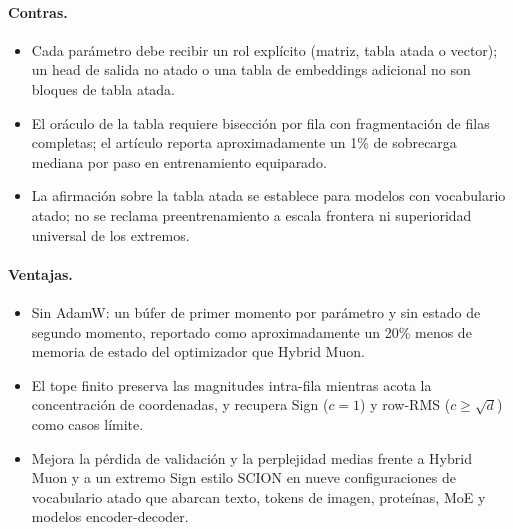 \paragraph{Contras.}
\begin{itemize}[leftmargin=*]
\item Cada parámetro debe recibir un rol explícito (matriz, tabla atada o vector); un head de salida no atado o una tabla de embeddings adicional no son bloques de tabla atada.
\item El oráculo de la tabla requiere bisección por fila con fragmentación de filas completas; el artículo reporta aproximadamente un 1\% de sobrecarga mediana por paso en entrenamiento equiparado.
\item La afirmación sobre la tabla atada se establece para modelos con vocabulario atado; no se reclama preentrenamiento a escala frontera ni superioridad universal de los extremos.
\end{itemize}

\paragraph{Ventajas.}
\begin{itemize}[leftmargin=*]
\item Sin AdamW: un búfer de primer momento por parámetro y sin estado de segundo momento, reportado como aproximadamente un 20\% menos de memoria de estado del optimizador que Hybrid Muon.
\item El tope finito preserva las magnitudes intra-fila mientras acota la concentración de coordenadas, y recupera Sign ($c=1$) y row-RMS ($c \geq \sqrt{d}$) como casos límite.
\item Mejora la pérdida de validación y la perplejidad medias frente a Hybrid Muon y a un extremo Sign estilo SCION en nueve configuraciones de vocabulario atado que abarcan texto, tokens de imagen, proteínas, MoE y modelos encoder-decoder.
\end{itemize}

